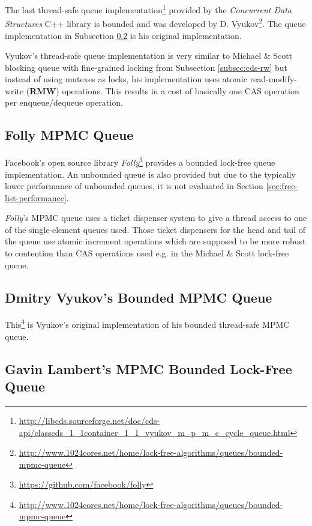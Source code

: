     The last thread-safe queue implementation\footnote{\url{http://libcds.sourceforge.net/doc/cds-api/classcds\_1\_1container\_1\_1\_vyukov\_m\_p\_m\_c\_cycle\_queue.html}} provided by the \textit{Concurrent Data Structures} C++ library is bounded and was developed by D. Vyukov\footnote{\url{http://www.1024cores.net/home/lock-free-algorithms/queues/bounded-mpmc-queue}}. The queue implementation in Subsection \ref{subsec:vyukov} is his original implementation.

    Vyukov's thread-safe queue implementation is very similar to Michael \& Scott blocking queue with fine-grained locking from Subsection \ref{subsec:cds-rw} but instead of using mutexes as locks, his implementation uses atomic read-modify-write (\textbf{RMW}) operations. This results in a cost of basically one CAS operation per enqueue/dequeue operation.

\subsection[Folly MPMC Queue]{Folly MPMC Queue} \label{subsec:folly-mpmc}

    Facebook's open source library \textit{Folly}\footnote{\url{https://github.com/facebook/folly}} provides a bounded lock-free queue implementation. An unbounded queue is also provided but due to the typically lower performance of unbounded queues, it is not evaluated in Section \ref{sec:free-list-performance}.

    \textit{Folly}'s MPMC queue uses a ticket dispenser system to give a thread access to one of the single-element queues used. Those ticket dispensers for the head and tail of the queue use atomic increment operations which are supposed to be more robust to contention than CAS operations used e.g. in the Michael \& Scott lock-free queue.

\subsection[Dmitry Vyukov's MPMC Queue]{Dmitry Vyukov's Bounded MPMC Queue} \label{subsec:vyukov}

    This\footnote{\url{http://www.1024cores.net/home/lock-free-algorithms/queues/bounded-mpmc-queue}} is Vyukov's original implementation of his bounded thread-safe MPMC queue.

\subsection[Gavin Lambert's MPMC Queue]{Gavin Lambert's MPMC Bounded Lock-Free Queue} \label{subsec:lampert}

